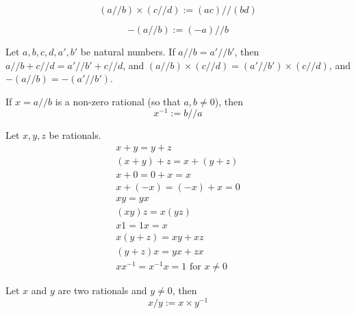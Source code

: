 \documentclass{blog}
\begin{document}
\begin{definition}[multiplication]
  \begin{equation}
    (a // b) \times (c // d) := (a c) // (b d)
  \end{equation}
\end{definition}

\begin{definition}[negation]
  \begin{equation}
    -(a // b) := (-a) // b
  \end{equation}
\end{definition}

\begin{lemma}
  Let $a, b, c, d, a', b'$ be natural numbers.
  If $a // b = a' // b'$, then $a // b + c // d = a' // b' + c // d$, and
  $(a // b) \times (c // d) = (a' // b') \times (c // d)$, and
  $-(a // b) = -(a' // b')$.
\end{lemma}

\begin{definition}[reciprocal]
  If $x = a // b$ is a non-zero rational (so that $a, b \neq 0$), then
  \begin{equation}
    x^{-1} := b // a
  \end{equation}
\end{definition}

\begin{proposition}[field]
  Let $x, y, z$ be rationals.
  \begin{gather}
    x + y = y + z \\
    (x + y) + z = x + (y + z) \\
    x + 0 = 0 + x = x \\
    x + (-x) = (-x) + x = 0 \\
    x y = y x \\
    (x y) z = x (y z) \\
    x 1 = 1 x = x \\
    x (y + z) = x y + x z \\
    (y + z) x = y x + z x \\
    x x^{-1} = x^{-1} x = 1 \text{ for } x \neq 0
  \end{gather}
\end{proposition}

\begin{definition}[quotient]
  Let $x$ and $y$ are two rationals and $y \neq 0$, then
  \begin{equation}
    x / y := x \times y^{-1}
  \end{equation}
\end{definition}
\end{document}
